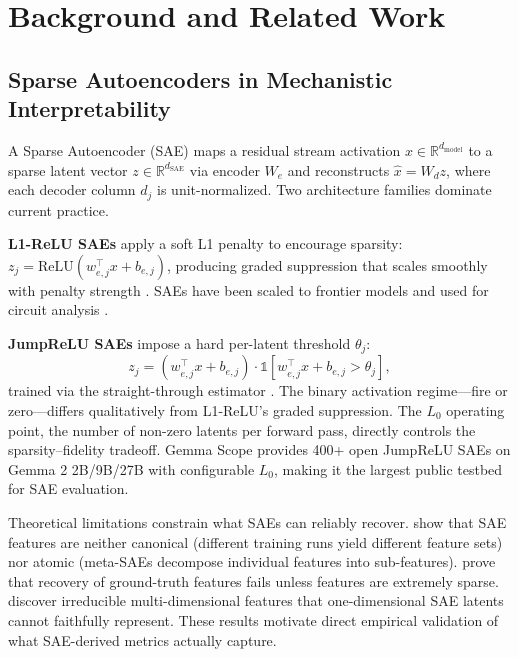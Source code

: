 \documentclass{article}
\begin{document}
\section{Background and Related Work}
\label{sec:background}

\subsection{Sparse Autoencoders in Mechanistic Interpretability}

A Sparse Autoencoder (SAE) maps a residual stream activation $x \in \mathbb{R}^{d_{\text{model}}}$ to a sparse latent vector $z \in \mathbb{R}^{d_{\text{SAE}}}$ via encoder $W_e$ and reconstructs $\hat{x} = W_d z$, where each decoder column $d_j$ is unit-normalized. Two architecture families dominate current practice.

\textbf{L1-ReLU SAEs} apply a soft L1 penalty to encourage sparsity: $z_j = \text{ReLU}(w_{e,j}^\top x + b_{e,j})$, producing graded suppression that scales smoothly with penalty strength \citep{cunningham2023sparse, bricken2023monosemanticity}. SAEs have been scaled to frontier models \citep{templeton2024scaling, gao2024topk} and used for circuit analysis \citep{lindsey2025circuits}.

\textbf{JumpReLU SAEs} impose a hard per-latent threshold $\theta_j$:
\begin{equation}
z_j = (w_{e,j}^\top x + b_{e,j}) \cdot \mathbb{1}[w_{e,j}^\top x + b_{e,j} > \theta_j],
\end{equation}
trained via the straight-through estimator \citep{rajamanoharan2024jumprelu}. The binary activation regime---fire or zero---differs qualitatively from L1-ReLU's graded suppression. The $L_0$ operating point, the number of non-zero latents per forward pass, directly controls the sparsity--fidelity tradeoff. Gemma Scope \citep{lieberum2024gemmascope} provides 400+ open JumpReLU SAEs on Gemma 2 2B/9B/27B with configurable $L_0$, making it the largest public testbed for SAE evaluation.

Theoretical limitations constrain what SAEs can reliably recover. \citet{leask2025canonical} show that SAE features are neither canonical (different training runs yield different feature sets) nor atomic (meta-SAEs decompose individual features into sub-features). \citet{cui2025recovery} prove that recovery of ground-truth features fails unless features are extremely sparse. \citet{engels2025multidimensional} discover irreducible multi-dimensional features that one-dimensional SAE latents cannot faithfully represent. These results motivate direct empirical validation of what SAE-derived metrics actually capture.
\end{document}
